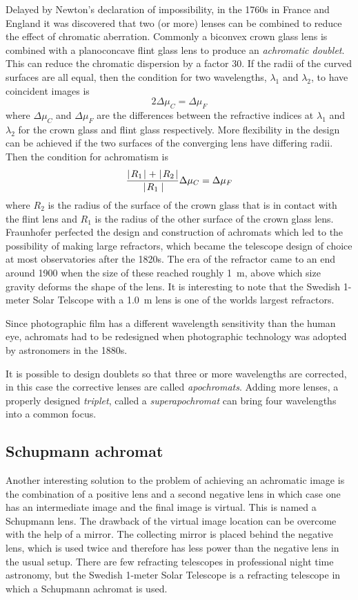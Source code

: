 Delayed by Newton's declaration of impossibility, in the 1760s in France 
and England it was discovered that 
two (or more) lenses can be combined to reduce the effect of chromatic 
aberration. Commonly a biconvex crown glass lens is combined with a 
planoconcave flint glass lens to produce an {\it achromatic doublet}. This can 
reduce the chromatic dispersion by a factor 30. If the radii of the 
curved surfaces are all equal, then the condition for two wavelengths,
$\lambda_1$ and $\lambda_2$, to have coincident images is 
\[
2\Delta\mu_C=\Delta\mu_F
\]
where $\Delta\mu_C$ and $\Delta\mu_F$ are the differences between the 
refractive indices at $\lambda_1$ and $\lambda_2$ for the crown glass and
flint glass respectively. More flexibility in the design can be achieved 
if the two surfaces of the converging lens have differing radii. Then the
condition for achromatism is
\[
{\mid\! R_1\!\mid+\mid\! R_2\!\mid\over\mid\! R_1\mid\!}\Delta\mu_C=\Delta\mu_F
\]
where $R_2$ is the radius of the surface of the crown glass that is in 
contact with the flint lens and $R_1$ is the radius of the other surface
of the crown glass lens. Fraunhofer perfected the design and construction
of achromats which led to the possibility of making large refractors, which became 
the telescope design of choice at most observatories after the 1820s.
The era of the refractor came to an end around 1900 when the size of these
reached roughly 1~m, above which size gravity deforms the shape of the lens. It is 
interesting to note that the Swedish 1-meter Solar Telscope with a 1.0~m lens is
one of the worlds largest refractors.

Since photographic film has a different wavelength sensitivity than the
human eye, achromats had to be redesigned when photographic technology 
was adopted by astronomers in the 1880s. 

It is possible to design doublets so that three or more wavelengths are corrected, in this
case the corrective lenses are called {\it apochromats}. Adding more lenses, a properly 
designed {\it triplet}, called a {\it superapochromat} can bring four wavelengths into 
a common focus.

\subsection{Schupmann achromat}

Another interesting solution to the problem of achieving an achromatic image
is the combination of a positive lens and a second negative lens in which case
one has an intermediate image and the final image is virtual. This is named
a Schupmann lens. The drawback of the virtual image location can be overcome
with the help of a mirror. The collecting mirror is placed behind the negative
lens, which is used twice and therefore has less power than the negative lens
in the usual setup. There are few refracting telescopes in professional night 
time astronomy, but the Swedish 1-meter Solar Telescope is a refracting 
telescope in which a Schupmann achromat is used.

